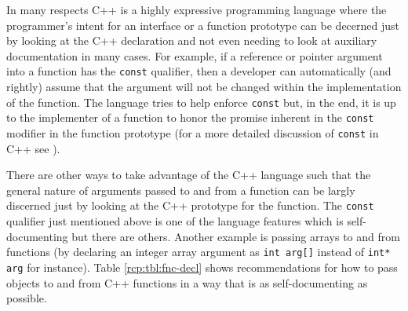 In many respects C++ is a highly expressive programming language where
the programmer's intent for an interface or a function prototype can
be decerned just by looking at the C++ declaration and not even
needing to look at auxiliary documentation in many cases.  For
example, if a reference or pointer argument into a function has the
{}\texttt{const} qualifier, then a developer can automatically (and
rightly) assume that the argument will not be changed within the
implementation of the function.  The language tries to help enforce
{}\texttt{const} but, in the end, it is up to the implementer of a
function to honor the promise inherent in the {}\texttt{const}
modifier in the function prototype (for a more detailed discussion of
{}\texttt{const} in C++ see {}\cite[Section
10.2.7.1]{ref:stroustrup_2000}).

There are other ways to take advantage of the C++ language such that
the general nature of arguments passed to and from a function can be
largly discerned just by looking at the C++ prototype for the
function.  The {}\texttt{const} qualifier just mentioned above is one
of the language features which is self-documenting but there are
others.  Another example is passing arrays to and from functions (by
declaring an integer array argument as {}\texttt{int arg[]} instead of
{}\texttt{int* arg} for instance).  Table {}\ref{rcp:tbl:fnc-decl}
shows recommendations for how to pass objects to and from C++
functions in a way that is as self-documenting as possible.

